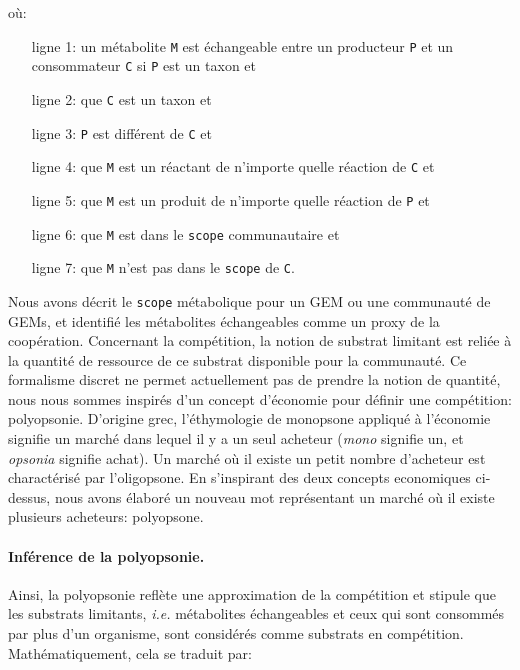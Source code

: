 \documentclass[../main.tex]{subfiles}
\begin{document}
où:

\begin{itemize}
	\item[ligne 1:] un métabolite \texttt{M} est échangeable entre un producteur \texttt{P} et un consommateur \texttt{C} si \texttt{P} est un taxon et 
	\item[ligne 2:] que \texttt{C} est un taxon et
	\item[ligne 3:] \texttt{P} est différent de \texttt{C} et
	\item[ligne 4:] que \texttt{M} est un réactant de n'importe quelle réaction de \texttt{C} et 
	\item[ligne 5:] que \texttt{M} est un produit de n'importe quelle réaction de \texttt{P} et
	\item[ligne 6:] que \texttt{M} est dans le \texttt{scope} communautaire et 
	\item[ligne 7:] que \texttt{M} n'est pas dans le \texttt{scope} de \texttt{C}.
\end{itemize}

Nous avons décrit le \texttt{scope} métabolique pour un GEM ou une communauté de GEMs, et identifié les métabolites échangeables comme un proxy de la coopération. Concernant la compétition, la notion de substrat limitant est reliée à la quantité de ressource de ce substrat  disponible pour la communauté. Ce formalisme discret ne permet actuellement pas de prendre la notion de quantité, nous nous sommes inspirés d'un concept d'économie pour définir une compétition: polyopsonie. D'origine grec, l'éthymologie de monopsone appliqué à l'économie signifie un marché dans lequel il y a un seul acheteur (\textit{mono} signifie un, et \textit{opsonia}  signifie achat). Un marché où il existe un petit nombre d'acheteur est charactérisé par l'oligopsone. En s'inspirant des deux concepts economiques ci-dessus, nous avons élaboré un nouveau mot représentant un marché où il existe plusieurs acheteurs: polyopsone.


\paragraph*{Inférence de la polyopsonie.} Ainsi, la polyopsonie reflète une approximation de la compétition et stipule que les substrats limitants, \textit{i.e.} métabolites échangeables et ceux qui sont consommés par plus d'un organisme, sont considérés comme substrats en compétition. Mathématiquement, cela se traduit par:
\end{document}
